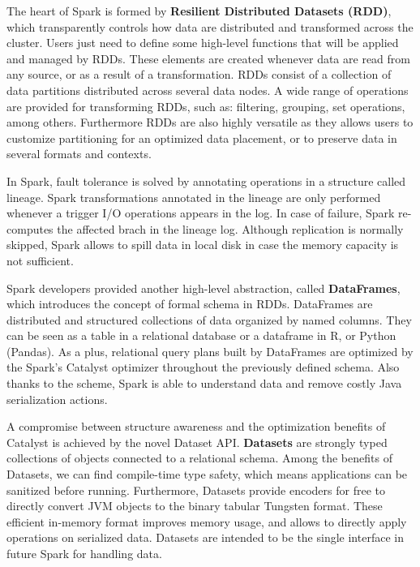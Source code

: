 \documentclass[3p,review]{elsarticle}
\begin{document}
The heart of Spark is formed by \textbf{Resilient Distributed Datasets (RDD)}, which transparently controls how data are distributed and transformed across the cluster. Users just need to define some high-level functions that will be applied and managed by RDDs. These elements are created whenever data are read from any source, or as a result of a transformation. RDDs consist of a collection of data partitions distributed across several data nodes. A wide range of operations are provided for transforming RDDs, such as: filtering, grouping, set operations, among others. Furthermore RDDs are also highly versatile as they allows users to customize partitioning for an optimized data placement, or to preserve data in several formats and contexts.

In Spark, fault tolerance is solved by annotating operations in a structure called lineage. Spark transformations annotated in the lineage are only performed whenever a trigger I/O operations appears in the log. In case of failure, Spark re-computes the affected brach in the lineage log. Although replication is normally skipped, Spark allows to spill data in local disk in case the memory capacity is not sufficient. 

Spark developers provided another high-level abstraction, called \textbf{DataFrames}, which introduces the concept of formal schema in RDDs. DataFrames are distributed and structured collections of data organized by named columns. They can be seen as a table in a relational database or a dataframe in R, or Python (Pandas). As a plus, relational query plans built by DataFrames are optimized by the Spark's Catalyst optimizer throughout the previously defined schema. Also thanks to the scheme, Spark is able to understand data and remove costly Java serialization actions.

A compromise between structure awareness and the optimization benefits of Catalyst is achieved by the novel Dataset API. \textbf{Datasets} are strongly typed collections of objects connected to a relational schema. Among the benefits of Datasets, we can find compile-time type safety, which means applications can be sanitized before running. Furthermore, Datasets provide encoders for free to directly convert JVM objects to the binary tabular Tungsten format. These efficient in-memory format improves memory usage, and allows to directly apply operations on serialized data. Datasets are intended to be the single interface in future Spark for handling data.
\end{document}
